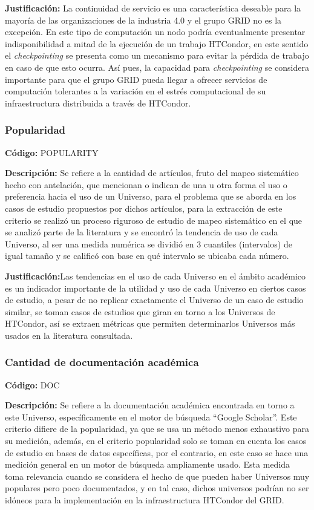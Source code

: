 \textbf{Justificación:} La continuidad de servicio es una característica deseable para la
mayoría de las organizaciones de la industria 4.0 y el grupo GRID no es la
excepción. En este tipo de computación un nodo podría eventualmente presentar
indisponibilidad a mitad de la ejecución de un trabajo HTCondor, en este sentido el
\textit{checkpointing} se presenta como un mecanismo para evitar la pérdida de trabajo en
caso de que esto ocurra. Así pues, la capacidad para \textit{checkpointing} se considera
importante para que el grupo GRID pueda llegar a ofrecer servicios de computación
tolerantes a la variación en el estrés computacional de su infraestructura distribuida
a través de HTCondor.



\subsubsection{Popularidad}
\textbf{Código:} POPULARITY

\textbf{Descripción:} Se refiere a la cantidad de artículos, fruto del mapeo sistemático
hecho con antelación, que mencionan o indican de una u otra forma el uso o
preferencia hacia el uso de un Universo, para el problema que se aborda en los
casos de estudio propuestos por dichos artículos, para la extracción de este
criterio se realizó un proceso riguroso de estudio de mapeo sistemático en el que
se analizó parte de la literatura y se encontró la tendencia de uso de cada
Universo, al ser una medida numérica se dividió en 3 cuantiles (intervalos) de igual
tamaño y se calificó con base en qué intervalo se ubicaba cada número.


\textbf{Justificación:}Las tendencias en el uso de cada Universo en el ámbito académico
es un indicador importante de la utilidad y uso de cada Universo en ciertos casos
de estudio, a pesar de no replicar exactamente el Universo de un caso de estudio
similar, se toman casos de estudios que giran en torno a los Universos de
HTCondor, así se extraen métricas que permiten determinarlos Universos más
usados en la literatura consultada.


\subsubsection{Cantidad de documentación académica}
\textbf{Código:} DOC

\textbf{Descripción:} Se refiere a la documentación académica encontrada en torno a
este Universo, específicamente en el motor de búsqueda “Google Scholar”. Este
criterio difiere de la popularidad, ya que se usa un método menos exhaustivo para
su medición, además, en el criterio popularidad solo se toman en cuenta los casos
de estudio en bases de datos específicas, por el contrario, en este caso se hace
una medición general en un motor de búsqueda ampliamente usado. Esta medida
toma relevancia cuando se considera el hecho de que pueden haber Universos
muy populares pero poco documentados, y en tal caso, dichos universos podrían
no ser idóneos para la implementación en la infraestructura HTCondor del GRID.



